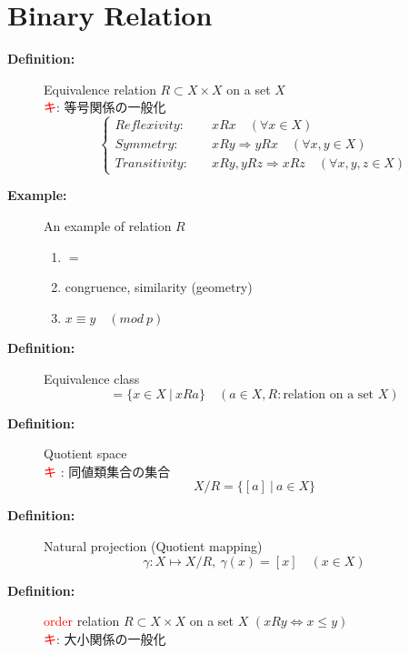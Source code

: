 \documentclass[english,dvipdfmx]{jsarticle}
\newcommand*{\point}{\textcircled{\textcolor{red}{\scriptsize キ}}}
\begin{document}
\section{Binary Relation}
\begin{description}
    \item[\bf{Definition:}] Equivalence relation $R \subset X \times X$ on a set $X$ \\
    \point : 等号関係の一般化
    \begin{equation*} \begin{cases}
        Reflexivity : \quad &xRx \quad ( \forall x \in X )  \\
        Symmetry : \quad  &xRy \Rightarrow yRx \quad ( \forall x,y \in X ) \\
        Transitivity : \quad &xRy , yRz \Rightarrow xRz \quad (\forall x,y,z \in X )
    \end{cases} 
    \end{equation*}
    \item[\bf{Example:}] An example of relation $R$
    \begin{enumerate}
        \item $ = $
        \item congruence, similarity (geometry)
        \item $x \equiv y \quad (mod \ p)$
    \end{enumerate} 
    \item[\bf{Definition:}] Equivalence class
    \begin{equation*}  
        [a] = \{ x \in X \ | \ xRa \} \quad ( a \in X , R : \text{relation on a set } X )
    \end{equation*}
    \item[\bf{Definition:}] Quotient space \\
    \textcircled{\textcolor{red}{\scriptsize キ}} : 同値類集合の集合
    \begin{equation*} 
    X / R = \{ [a] \ | \ a \in X \} 
    \end{equation*}
    \item[\bf{Definition:}] Natural projection (Quotient mapping)
    \begin{equation*} 
    \gamma : X \longmapsto X / R ,\ \gamma(x) = [x] \quad ( x \in X )
    \end{equation*}
    \item[\bf{Definition:}] \textcolor{red}{order} relation $R \subset X \times X$ on a set $X$ $( xRy \Leftrightarrow x\leq y)$ \\ 
    \point : 大小関係の一般化

\end{description}
\end{document}
